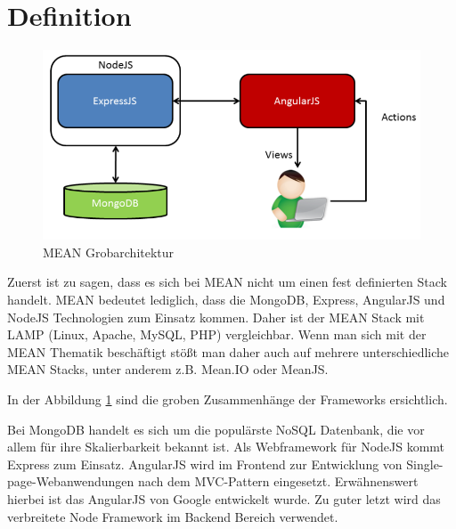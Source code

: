 \section{Definition}
\label{definition-fabi}

\begin{figure}[h]
	\centering
	\includegraphics[width=0.7\linewidth]{figures/mean-grobarchitektur.png}
	\caption{MEAN Grobarchitektur}
	\label{f:mean-grobarchitektur}
\end{figure}

Zuerst ist zu sagen, dass es sich bei MEAN nicht um einen fest definierten Stack handelt. MEAN bedeutet lediglich, dass die MongoDB, Express, AngularJS und NodeJS Technologien zum Einsatz kommen. Daher ist der MEAN Stack mit LAMP (Linux, Apache, MySQL, PHP) vergleichbar. Wenn man sich mit der MEAN Thematik beschäftigt stößt man daher auch auf mehrere unterschiedliche MEAN Stacks, unter anderem z.B. Mean.IO oder MeanJS.

In der Abbildung \ref{f:mean-grobarchitektur} sind die groben Zusammenhänge der Frameworks ersichtlich.

Bei MongoDB handelt es sich um die populärste NoSQL Datenbank, die vor allem für ihre Skalierbarkeit bekannt ist. Als Webframework für NodeJS kommt Express zum Einsatz. AngularJS wird im Frontend zur Entwicklung von Single-page-Webanwendungen nach dem MVC-Pattern eingesetzt. Erwähnenswert hierbei ist das AngularJS von Google entwickelt wurde. Zu guter letzt wird das verbreitete Node Framework im Backend Bereich verwendet.